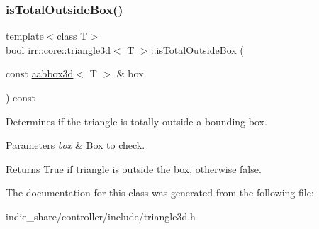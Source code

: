 \subsubsection{\texorpdfstring{is\+Total\+Outside\+Box()}{isTotalOutsideBox()}\hspace{0.1cm}{\footnotesize\ttfamily [2/2]}}
{\footnotesize\ttfamily template$<$class T$>$ \\
bool \hyperlink{classirr_1_1core_1_1triangle3d}{irr\+::core\+::triangle3d}$<$ T $>$\+::is\+Total\+Outside\+Box (\begin{DoxyParamCaption}\item[{const \hyperlink{classirr_1_1core_1_1aabbox3d}{aabbox3d}$<$ T $>$ \&}]{box }\end{DoxyParamCaption}) const\hspace{0.3cm}{\ttfamily [inline]}}



Determines if the triangle is totally outside a bounding box. 


\begin{DoxyParams}{Parameters}
{\em box} & Box to check. \\
\hline
\end{DoxyParams}
\begin{DoxyReturn}{Returns}
True if triangle is outside the box, otherwise false. 
\end{DoxyReturn}


The documentation for this class was generated from the following file\+:\begin{DoxyCompactItemize}
\item 
indie\+\_\+share/controller/include/triangle3d.\+h\end{DoxyCompactItemize}
